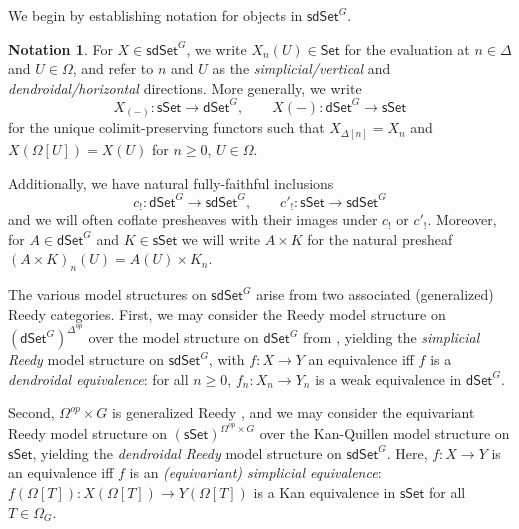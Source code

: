 \documentclass[a4paper,10pt
,draft
]{article}%
\numberwithin{equation}{section}
\numberwithin{figure}{section}
\theoremstyle{definition} %
\newtheorem{notation}[equation]{Notation}%
\newcommand{\longto}{\longrightarrow}%
\newcommand{\Set}{\ensuremath{\mathsf{Set}}}
\newcommand{\sSet}{\ensuremath{\mathsf{sSet}}}%
\newcommand{\dSet}{\mathsf{dSet}}
\DeclareMathOperator{\Aut}{Aut}%
\newcommand{\1}{\ensuremath{\mathbbm 1}}%
\begin{document}
We begin by establishing notation for objects in $\mathsf{sdSet}^G$.
\begin{notation}
      For $X \in \mathsf{sdSet}^G$, we write $X_n(U) \in \Set$ for the evaluation at $n \in \Delta$ and $U \in \Omega$,
      and refer to $n$ and $U$ as the \textit{simplicial/vertical} and \textit{dendroidal/horizontal} directions.
      More generally, we write
      \begin{equation}
            \label{SDSET_EQ}
            X_{(-)} \colon \sSet \to \dSet^G,
            \qquad
            X(-) \colon \dSet^G \to \sSet
      \end{equation}
      for the unique colimit-preserving functors
      such that $X_{\Delta[n]} = X_n$ and $X(\Omega[U]) = X(U)$ for $n \geq 0$, $U \in \Omega$.

      Additionally, we have natural fully-faithful inclusions
      \[
            c_{!} \colon \dSet^G \longto \mathsf{sdSet}^G,
            \qquad
            c'_! \colon \sSet \longto \mathsf{sdSet}^G
      \]
      and we will often coflate presheaves with their images under $c_!$ or $c'_!$.
      Moreover, for $A \in \dSet^G$ and $K \in \sSet$ we will write $A \times K$ for the natural presheaf $(A \times K)_n(U) = A(U) \times K_n$.
\end{notation}

The various model structures on $\mathsf{sdSet}^G$ arise from two associated (generalized) Reedy categories.
First, we may consider the Reedy model structure on $(\dSet^G)^{\Delta^{op}}$ over the model structure on $\dSet^G$ from \cite{Per18},
yielding the \textit{simplicial Reedy} model structure on $\mathsf{sdSet}^G$,
with $f \colon X \to Y$ an equivalence iff $f$ is a \textit{dendroidal equivalence}: for all $n \geq 0$, $f_n: X_n \to Y_n$ is a weak equivalence in $\dSet^G$.

Second, $\Omega^{op} \times G$ is generalized Reedy \cite[Example A.7]{BP_edss},
and we may consider the equivariant Reedy model structure on $(\sSet)^{\Omega^{op} \times G}$ over the Kan-Quillen model structure on $\sSet$,
yielding the \textit{dendroidal Reedy} model structure on $\mathsf{sdSet}^G$.
Here, $f\colon X \to Y$ is an equivalence iff $f$ is an \textit{(equivariant) simplicial equivalence}:
$f(\Omega[T]) \colon X(\Omega[T]) \to Y(\Omega[T])$ is a Kan equivalence in $\sSet$ for all $T \in \Omega_G$.
\end{document}
